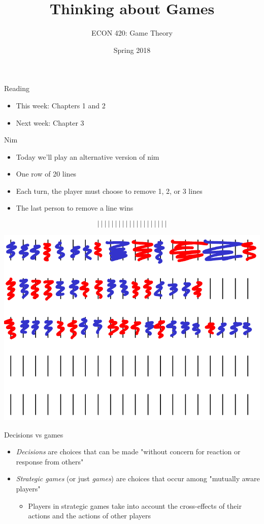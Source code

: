 \documentclass[10pt]{beamer}
\author{ECON 420: Game Theory}
\date{Spring 2018}
\title{Thinking about Games}
\begin{document}
\maketitle

\begin{frame}[label={sec:org2405b21}]{}
\alert{Reading}
\begin{itemize}
\item This week: Chapters 1 and 2
\item Next week: Chapter 3
\end{itemize}
\end{frame}

\begin{frame}[label={sec:orgf243246}]{}
\alert{Nim}
\begin{itemize}
\item Today we'll play an alternative version of nim
\item One row of 20 lines
\item Each turn, the player must choose to remove 1, 2, or 3 lines
\item The last person to remove a line wins
\end{itemize}
$$|~|~|~|~|~|~|~|~|~|~|~|~|~|~|~|~|~|~|~|$$
\end{frame}

\begin{frame}[label={sec:org47ebe80}]{}
\begin{center}
\includegraphics[width=.75\textwidth]{./img/nim.png}
\end{center}
\end{frame}

\begin{frame}[label={sec:org2b83ad3}]{}
\alert{Decisions vs games}
\begin{itemize}
\item \emph{Decisions} are choices that can be made "without concern for reaction or response from others"
\item \emph{Strategic games} (or just \emph{games}) are choices that occur among "mutually aware players"
\begin{itemize}
\item Players in strategic games take into account the cross-effects of their actions and the actions of other players
\end{itemize}
\end{itemize}
\end{frame}
\end{document}
